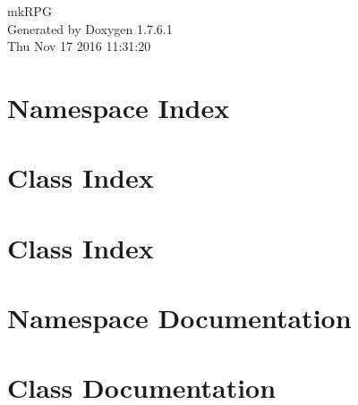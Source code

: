 \documentclass[a4paper]{book}
\begin{document}
\hypersetup{pageanchor=false,citecolor=blue}
\begin{titlepage}
\vspace*{7cm}
\begin{center}
{\Large mk\-R\-P\-G }\\
\vspace*{1cm}
{\large \-Generated by Doxygen 1.7.6.1}\\
\vspace*{0.5cm}
{\small Thu Nov 17 2016 11:31:20}\\
\end{center}
\end{titlepage}
\clearemptydoublepage
{}
\tableofcontents
\clearemptydoublepage
{}
\hypersetup{pageanchor=true,citecolor=blue}
\chapter{\-Namespace \-Index}

\chapter{\-Class \-Index}

\chapter{\-Class \-Index}

\chapter{\-Namespace \-Documentation}

\chapter{\-Class \-Documentation}




































\printindex
\end{document}
